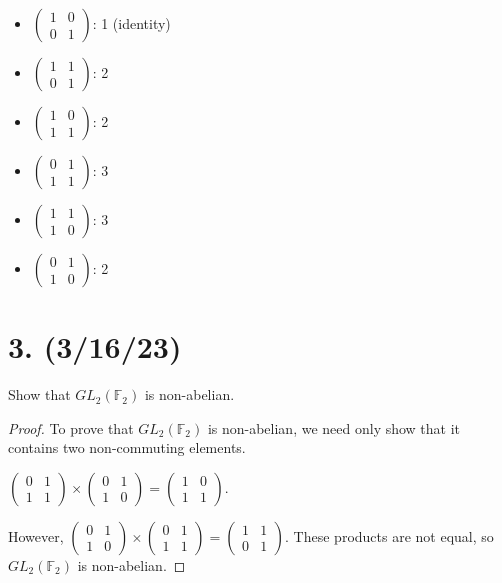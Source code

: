 \documentclass{article}
\begin{document}
\begin{itemize}
    \item $\begin{pmatrix}1 & 0\\0 & 1\end{pmatrix}$: 1 (identity)
    \item $\begin{pmatrix}1 & 1\\0 & 1\end{pmatrix}$: 2
    \item $\begin{pmatrix}1 & 0\\1 & 1\end{pmatrix}$: 2
    \item $\begin{pmatrix}0 & 1\\1 & 1\end{pmatrix}$: 3
    \item $\begin{pmatrix}1 & 1\\1 & 0\end{pmatrix}$: 3
    \item $\begin{pmatrix}0 & 1\\1 & 0\end{pmatrix}$: 2
\end{itemize}

\section*{3. (3/16/23)}

Show that $GL_2(\mathbb{F}_2)$ is non-abelian.

\begin{proof}
    To prove that $GL_2(\mathbb{F}_2)$ is non-abelian, we need only show that it contains two non-commuting elements.

    $\begin{pmatrix}0 & 1\\1 & 1\end{pmatrix} \times \begin{pmatrix}0 & 1\\1 & 0\end{pmatrix} = \begin{pmatrix}1 & 0\\1 & 1\end{pmatrix}$.

    However, $\begin{pmatrix}0 & 1\\1 & 0\end{pmatrix} \times \begin{pmatrix}0 & 1\\1 & 1\end{pmatrix} = \begin{pmatrix}1 & 1\\0 & 1\end{pmatrix}$. These products are not equal, so $GL_2(\mathbb{F}_2)$ is non-abelian.
\end{proof}
\end{document}
